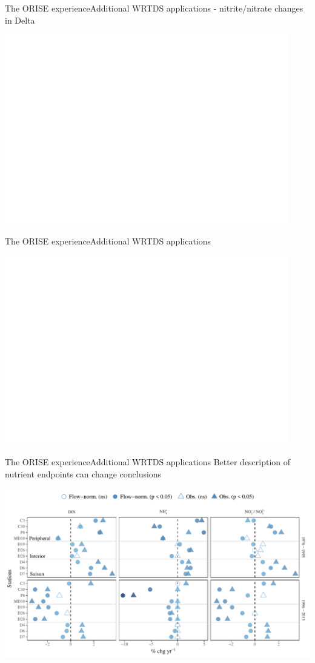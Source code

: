 \documentclass[serif]{beamer}\usepackage[]{graphicx}\usepackage[]{color}
\begin{document}
\begin{frame}{The ORISE experience}{Additional WRTDS applications - nitrite/nitrate changes in Delta}
\centerline{\includegraphics[width = 0.93\textwidth, page = 2]{fig/trndspernh.pdf}}
\end{frame}

\begin{frame}{The ORISE experience}{Additional WRTDS applications}
\centerline{\includegraphics[width = 0.93\textwidth, page = 2]{fig/trndsperno23.pdf}}
\end{frame}

\begin{frame}{The ORISE experience}{Additional WRTDS applications}
Better description of nutrient endpoints can change conclusions
\centerline{\includegraphics[width = \textwidth]{fig/trndcomp1.pdf}}
\end{frame}
\end{document}
